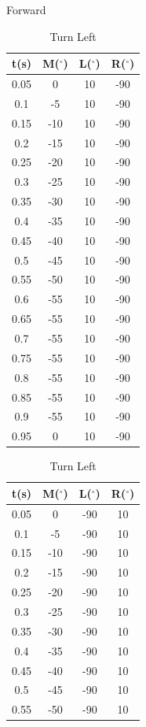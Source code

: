 \documentclass[a4paper, 12pt, oneside]{article} %
\begin{document}
\begin{itemize}
\begin{table}[htbp]
\begin{minipage}{0.33\textwidth}
				\caption{Forward}
			\end{minipage}
			\begin{minipage}{0.33\textwidth}
				\centering
				\begin{tabular}{cccc}
					\hline
					t(s) & M($^{\circ}$) & L($^{\circ}$) & R($^{\circ}$)\\
					\hline
					0.05&0&10&-90\\
					0.1&-5&10&-90\\
					0.15&-10&10&-90\\
					0.2&-15&10&-90\\
					0.25&-20&10&-90\\
					0.3&-25&10&-90\\
					0.35&-30&10&-90\\
					0.4&-35&10&-90\\
					0.45&-40&10&-90\\
					0.5&-45&10&-90\\
					0.55&-50&10&-90\\
					0.6&-55&10&-90\\
					0.65&-55&10&-90\\
					0.7&-55&10&-90\\
					0.75&-55&10&-90\\
					0.8&-55&10&-90\\
					0.85&-55&10&-90\\
					0.9&-55&10&-90\\
					0.95&0&10&-90\\
					\hline
				\end{tabular}
				\caption{Turn Left}
			\end{minipage}
			\begin{minipage}{0.33\textwidth}
				\centering
				\begin{tabular}{cccc}
					\hline
					t(s) & M($^{\circ}$) & L($^{\circ}$) & R($^{\circ}$)\\
					\hline
					0.05&0&-90&10\\
					0.1&-5&-90&10\\
					0.15&-10&-90&10\\
					0.2&-15&-90&10\\
					0.25&-20&-90&10\\
					0.3&-25&-90&10\\
					0.35&-30&-90&10\\
					0.4&-35&-90&10\\
					0.45&-40&-90&10\\
					0.5&-45&-90&10\\
					0.55&-50&-90&10\\

\end{tabular}
\end{minipage}
\end{table}
\end{itemize}
\end{document}
